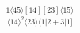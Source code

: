 \documentclass[varwidth, border=5pt]{standalone}
\begin{document}
\begin{my}
$\begin{gathered}
\scriptscriptstyle\frac{1⟨45⟩[14][23]⟨15⟩}{⟨14⟩^2⟨23⟩⟨1|2+3|1]}
\end{gathered}$
\end{my}
\end{document}
